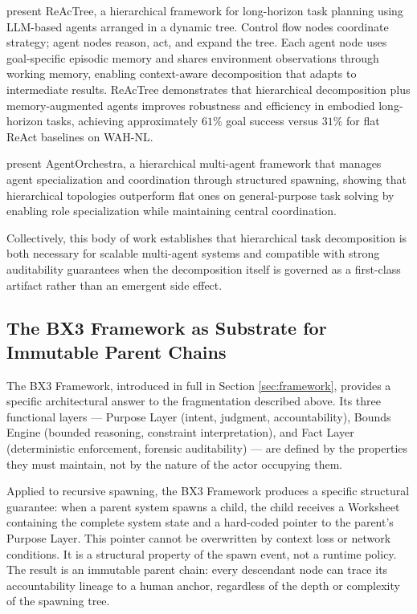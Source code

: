  present ReAcTree, a hierarchical framework for long-horizon task planning using LLM-based agents arranged in a dynamic tree. Control flow nodes coordinate strategy; agent nodes reason, act, and expand the tree. Each agent node uses goal-specific episodic memory and shares environment observations through working memory, enabling context-aware decomposition that adapts to intermediate results. ReAcTree demonstrates that hierarchical decomposition plus memory-augmented agents improves robustness and efficiency in embodied long-horizon tasks, achieving approximately $61\%$ goal success versus $31\%$ for flat ReAct baselines on WAH-NL.

 present AgentOrchestra, a hierarchical multi-agent framework that manages agent specialization and coordination through structured spawning, showing that hierarchical topologies outperform flat ones on general-purpose task solving by enabling role specialization while maintaining central coordination.

Collectively, this body of work establishes that hierarchical task decomposition is both necessary for scalable multi-agent systems and compatible with strong auditability guarantees when the decomposition itself is governed as a first-class artifact rather than an emergent side effect.

\subsection{The BX3 Framework as Substrate for Immutable Parent Chains}

The BX3 Framework, introduced in full in Section \ref{sec:framework}, provides a specific architectural answer to the fragmentation described above. Its three functional layers --- Purpose Layer (intent, judgment, accountability), Bounds Engine (bounded reasoning, constraint interpretation), and Fact Layer (deterministic enforcement, forensic auditability) --- are defined by the properties they must maintain, not by the nature of the actor occupying them.

Applied to recursive spawning, the BX3 Framework produces a specific structural guarantee: when a parent system spawns a child, the child receives a Worksheet containing the complete system state and a hard-coded pointer to the parent's Purpose Layer. This pointer cannot be overwritten by context loss or network conditions. It is a structural property of the spawn event, not a runtime policy. The result is an immutable parent chain: every descendant node can trace its accountability lineage to a human anchor, regardless of the depth or complexity of the spawning tree.

